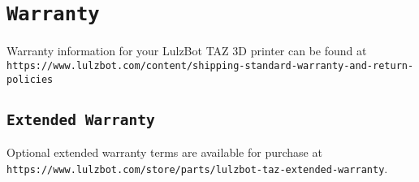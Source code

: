 %
%
%
%
%

\section{\texttt{Warranty}}
Warranty information for your LulzBot\textsuperscript{\miniscule{\textregistered}} TAZ 3D printer can be found at \texttt{https://www.lulzbot.com/content/shipping-standard-warranty-and-return-policies}

\subsection{\texttt{Extended Warranty}}
Optional extended warranty terms are available for purchase at \texttt{https://www.lulzbot.com/store/parts/lulzbot-taz-extended-warranty}.
